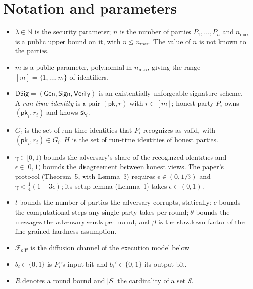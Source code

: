 \documentclass{conjura-conjecture}
\newcommand{\pk}{\mathsf{pk}}
\newcommand{\sk}{\mathsf{sk}}
\newcommand{\DSig}{\mathsf{DSig}}
\newcommand{\Gen}{\mathsf{Gen}}
\newcommand{\Sig}{\mathsf{Sign}}
\newcommand{\Ver}{\mathsf{Verify}}
\newcommand{\Fdiff}{\mathcal{F}_{\mathsf{diff}}}
\begin{document}
\section{Notation and parameters}\label{sec:notation}

\begin{itemize}
\item $\lambda \in \mathbb{N}$ is the security parameter; $n$ is the
  number of parties $P_1,\dots,P_n$ and $n_{\max}$ is a public upper
  bound on it, with $n \le n_{\max}$. The value of $n$ is not known to
  the parties.
\item $m$ is a public parameter, polynomial in $n_{\max}$, giving the
  range $[m] = \{1,\dots,m\}$ of identifiers.
\item $\DSig = (\Gen,\Sig,\Ver)$ is an existentially unforgeable
  signature scheme. A \emph{run-time identity} is a pair $(\pk, r)$ with
  $r \in [m]$; honest party $P_i$ owns $(\pk_i, r_i)$ and knows
  $\sk_i$.
\item $G_i$ is the set of run-time identities that $P_i$ recognizes as
  valid, with $(\pk_i, r_i) \in G_i$. $H$ is the set of run-time
  identities of honest parties.
\item $\gamma \in [0,1)$ bounds the adversary's share of the recognized
  identities and $\epsilon \in [0,1)$ bounds the disagreement between
  honest views. The paper's protocol (Theorem~5, with Lemma~3) requires
  $\epsilon \in (0,1/3)$ and $\gamma < \frac{1}{4}(1-3\epsilon)$; its
  setup lemma (Lemma~1) takes $\epsilon \in (0,1)$.
\item $t$ bounds the number of parties the adversary corrupts,
  statically; $c$ bounds the computational steps any single party takes
  per round; $\theta$ bounds the messages the adversary sends per round;
  and $\beta$ is the slowdown factor of the fine-grained hardness
  assumption.
\item $\Fdiff$ is the diffusion channel of the execution model below.
\item $b_i \in \{0,1\}$ is $P_i$'s input bit and $b_i' \in \{0,1\}$ its
  output bit.
\item $R$ denotes a round bound and $|S|$ the cardinality of a set $S$.
\end{itemize}
\end{document}
